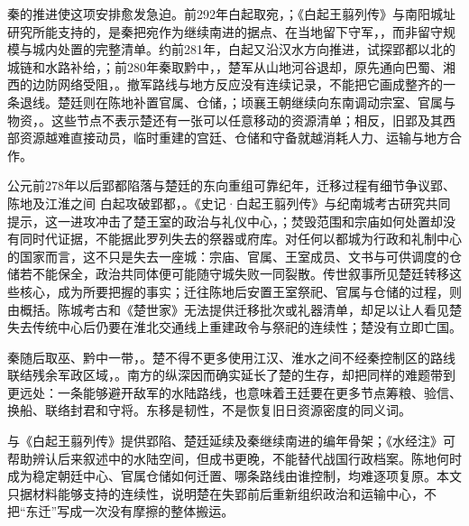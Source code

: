 秦的推进使这项安排愈发急迫。前292年白起取宛，；《白起王翦列传》与南阳城址研究所能支持的，是秦把宛作为继续南进的据点、在当地留下守军，，而非留守规模与城内处置的完整清单。约前281年，白起又沿汉水方向推进，试探郢都以北的城链和水路补给，；前280年秦取黔中，，楚军从山地河谷退却，原先通向巴蜀、湘西的边防网络受阻，。撤军路线与地方反应没有连续记录，不能把它画成整齐的一条退线。楚廷则在陈地补置官属、仓储，；顷襄王朝继续向东南调动宗室、官属与物资，。这些节点不表示楚还有一张可以任意移动的资源清单；相反，旧郢及其西部资源越难直接动员，临时重建的宫廷、仓储和守备就越消耗人力、运输与地方合作。

\begin{event}{公元前278年以后}{郢都陷落与楚廷的东向重组}{可靠纪年，迁移过程有细节争议}{郢、陈地及江淮之间}
白起攻破郢都，。《史记·白起王翦列传》与纪南城考古研究共同提示，这一进攻冲击了楚王室的政治与礼仪中心，；焚毁范围和宗庙如何处置却没有同时代证据，不能据此罗列失去的祭器或府库。对任何以都城为行政和礼制中心的国家而言，这不只是失去一座城：宗庙、官属、王室成员、文书与可供调度的仓储若不能保全，政治共同体便可能随守城失败一同裂散。传世叙事所见楚廷转移这些核心，成为所要把握的事实；迁往陈地后安置王室祭祀、官属与仓储的过程，则由概括。陈城考古和《楚世家》无法提供迁移批次或礼器清单，却足以让人看见楚失去传统中心后仍要在淮北交通线上重建政令与祭祀的连续性；楚没有立即亡国。

秦随后取巫、黔中一带，。楚不得不更多使用江汉、淮水之间不经秦控制区的路线联结残余军政区域，。南方的纵深因而确实延长了楚的生存，却把同样的难题带到更远处：一条能够避开敌军的水陆路线，也意味着王廷要在更多节点筹粮、验信、换船、联络封君和守将。东移是韧性，不是恢复旧日资源密度的同义词。


\end{event}

\begin{sourcenote}
与《白起王翦列传》提供郢陷、楚廷延续及秦继续南进的编年骨架；《水经注》可帮助辨认后来叙述中的水陆空间，但成书更晚，不能替代战国行政档案。陈地何时成为稳定朝廷中心、官属仓储如何迁置、哪条路线由谁控制，均难逐项复原。本文只据材料能够支持的连续性，说明楚在失郢前后重新组织政治和运输中心，不把“东迁”写成一次没有摩擦的整体搬运。
\end{sourcenote}


